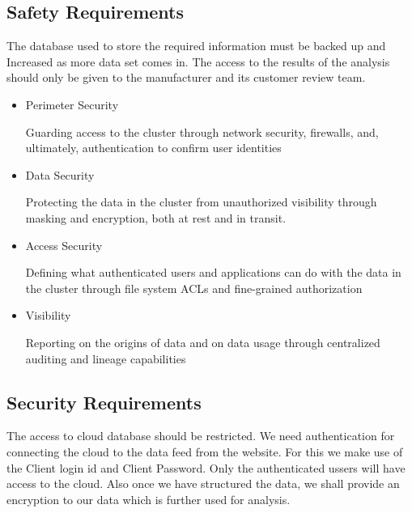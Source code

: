 \documentclass[oneside,a4paper,12pt]{book}
\begin{document}
\subsection{Safety Requirements}
The database used to store the required information must be backed up and Increased as more data set comes in. The access to the results of the analysis should only be given to the manufacturer and its customer review team.
\begin{itemize}
    \item Perimeter Security
    \par Guarding access to the cluster through network security, firewalls, and, ultimately, authentication to confirm user identities
    \item Data Security
    \par Protecting the data in the cluster from unauthorized visibility through masking and encryption, both at rest and in transit.
    \item Access Security
    \par Defining what authenticated users and applications can do with the data in the cluster through file  system ACLs and fine-grained authorization
    \item Visibility 
    \par Reporting on the origins of data and on data usage through centralized auditing and lineage capabilities
\end{itemize}
\subsection{Security Requirements}
The access to cloud database should be restricted. We need  authentication for connecting the cloud to the data feed from the website. For this we make use of the Client login id and Client Password. Only the authenticated ussers will have access to the cloud. Also once we have structured the data, we shall provide an encryption to our data which is further used for analysis.
\end{document}
